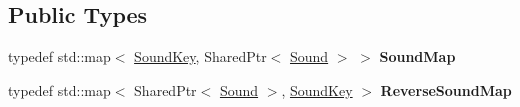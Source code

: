\subsection*{Public Types}
\begin{DoxyCompactItemize}
\item 
typedef std\+::map$<$ \hyperlink{classAudio_1_1____impl_1_1OpenAL_1_1RendererData_1_1SoundKey}{Sound\+Key}, Shared\+Ptr$<$ \hyperlink{classAudio_1_1Sound}{Sound} $>$ $>$ {\bfseries Sound\+Map}\hypertarget{structAudio_1_1____impl_1_1OpenAL_1_1RendererData_aff2a86a1a2d524a207aec2cf38a4ff74}{}\label{structAudio_1_1____impl_1_1OpenAL_1_1RendererData_aff2a86a1a2d524a207aec2cf38a4ff74}

\item 
typedef std\+::map$<$ Shared\+Ptr$<$ \hyperlink{classAudio_1_1Sound}{Sound} $>$, \hyperlink{classAudio_1_1____impl_1_1OpenAL_1_1RendererData_1_1SoundKey}{Sound\+Key} $>$ {\bfseries Reverse\+Sound\+Map}\hypertarget{structAudio_1_1____impl_1_1OpenAL_1_1RendererData_ae5dd22c4c5f2025fb39a3e89f20f4af5}{}\label{structAudio_1_1____impl_1_1OpenAL_1_1RendererData_ae5dd22c4c5f2025fb39a3e89f20f4af5}

\end{DoxyCompactItemize}
